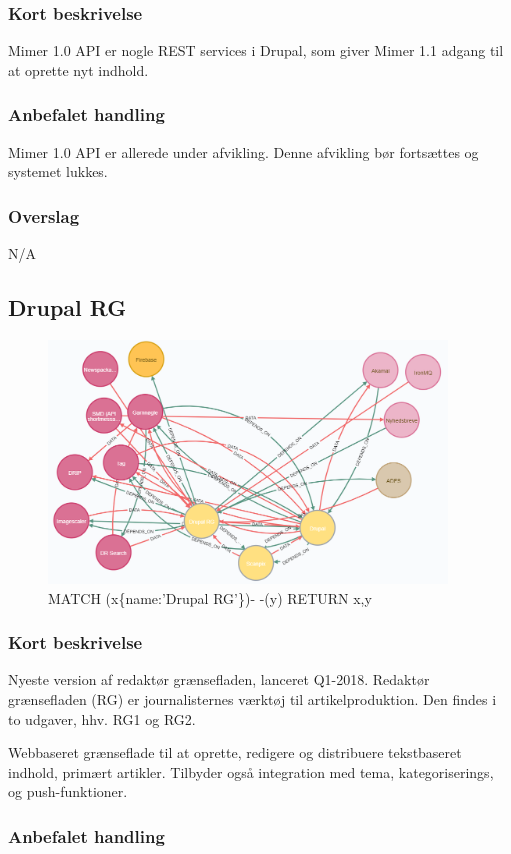 \documentclass{article}
\begin{document}
\subsubsection{Kort beskrivelse}
Mimer 1.0 API er nogle REST services i Drupal, som giver Mimer 1.1 adgang til at oprette nyt indhold.
\subsubsection{Anbefalet handling}
Mimer 1.0 API er allerede under afvikling. Denne afvikling bør fortsættes og systemet lukkes.
\subsubsection{Overslag}
N/A

\subsection{Drupal RG}
\begin{figure}[h]
\includegraphics[width=300pt]{DrupalRG.PNG}
\caption{MATCH (x\{name:'Drupal RG'\})- -(y) RETURN x,y}
\end{figure}
\subsubsection{Kort beskrivelse}
Nyeste version af redaktør grænsefladen, lanceret Q1-2018. Redaktør grænsefladen (RG) er journalisternes værktøj til artikelproduktion. Den findes i to udgaver, hhv. RG1 og RG2.	

Webbaseret grænseflade til at oprette, redigere og distribuere tekstbaseret indhold, primært artikler. Tilbyder også integration med tema, kategoriserings, og push-funktioner.
\subsubsection{Anbefalet handling}
\end{document}
